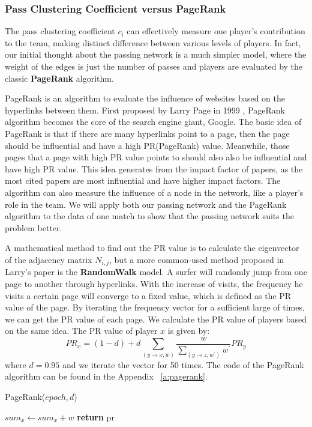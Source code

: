 \documentclass{mcmthesis}
\begin{document}
 \subsubsection{Pass Clustering Coefficient versus PageRank}
 The pass clustering coefficient $c_{i}$ can effectively measure one player's contribution to the team, making distinct difference between various levels of players. In fact, our initial thought about the passing network is a much simpler model, where the weight of the edges is just the number of passes and players are evaluated by the classic \textbf{PageRank} algorithm.

 PageRank is an algorithm to evaluate the influence of websites based on the hyperlinks between them. First proposed by Larry Page in 1999 \cite{PageRank}, PageRank algorithm becomes the core of the search engine giant, Google. The basic idea of PageRank is that if there are many hyperlinks point to a page, then the page should be influential and have a high PR(PageRank) value. Meanwhile, those pages that a page with high PR value points to should also also be influential and have high PR value. This idea generates from the impact factor of papers, as the most cited papers are most influential and have higher impact factors. The algorithm can also measure the influence of a node in the network, like a player's role in the team. We will apply both our passing network and the PageRank algorithm to the data of one match to show that the passing network suits the problem better.

 A mathematical method to find out the PR value is to calculate the eigenvector of the adjacency matrix $N_{i,j}$, but a more common-used method proposed in Larry's paper \cite{PageRank} is the \textbf{RandomWalk} model. A surfer will randomly jump from one page to another through hyperlinks. With the increase of visits, the frequency he visits a certain page will converge to a fixed value, which is defined as the PR value of the page. By iterating the frequency vector for a sufficient large of times, we can get the PR value of each page. We calculate the PR value of players based on the same idea. The PR value of player $x$ is given by:$$PR_{x}=(1-d)+d\sum \limits_{(y\rightarrow x,w)} \frac{w}{\sum_{(y \rightarrow z, w^{'})}w^{'}}PR_{y}$$
 where $d=0.95$ and we iterate the vector for 50 times. The code of the PageRank algorithm can be found in the Appendix ~\ref{a:pagerank}.

\begin{algorithm}
\caption{PageRank($epoch, d$)}
 {
    $sum_x \leftarrow sum_x + w$
}
\textbf{return} pr
\end{algorithm}
\end{document}
